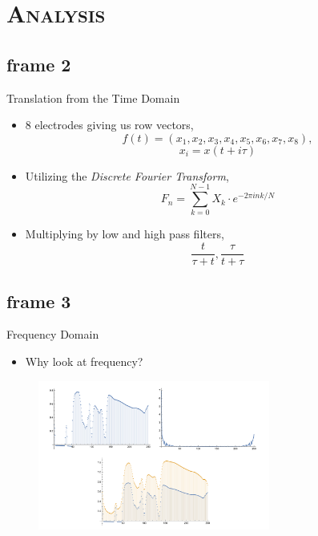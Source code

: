 \documentclass[xcolor=x11names,compress]{beamer}
\renewcommand{\(}{\begin{columns}}
\renewcommand{\)}{\end{columns}}
\newcommand{\<}[1]{\begin{column}{#1}}
\renewcommand{\>}{\end{column}}
\begin{document}
\section{\scshape Analysis}
\subsection{frame 2}
\begin{frame}{Translation from the Time Domain}

\begin{itemize}
\item
8 electrodes giving us row vectors, $$f(t) = (x_1,x_2,x_3,x_4,x_5,x_6,x_7,x_8),$$ $$x_i=x(t+i\tau)$$
\item
Utilizing the \textit{Discrete Fourier Transform}, $$F_n=\sum_{k=0}^{N-1}X_k  \cdot  e^{-2\pi i n k/N}$$
\item
Multiplying by low and high pass filters, $$\frac{t}{\tau + t},\frac{\tau}{t+\tau}$$
\end{itemize}
\end{frame}


\subsection{frame 3}
\begin{frame}{Frequency Domain}
\begin{itemize}
\item Why look at frequency?
\end{itemize}
\begin{figure}[h]
   \centering
   \includegraphics[width=3in]{Fourier.pdf} 
   \label{fig:example}
\end{figure}
\end{frame}
\end{document}
